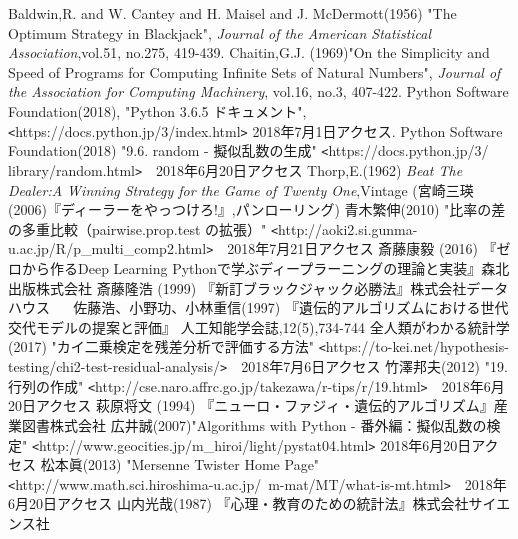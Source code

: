 \begin{thebibliography}{9}
   Baldwin,R. and W. Cantey and H. Maisel and J. McDermott(1956) "The Optimum Strategy in Blackjack", {\it{Journal of the American Statistical Association}},vol.51, no.275, 419-439.
   Chaitin,G.J. (1969)"On the Simplicity and Speed of Programs for Computing Infinite Sets of Natural Numbers", {\it{Journal of the Association for Computing Machinery}}, vol.16, no.3, 407-422.
   Python Software Foundation(2018), "Python 3.6.5 ドキュメント", \verb|<|https://docs.python.jp/3/index.html\verb|>| 2018年7月1日アクセス.
   Python Software Foundation(2018) "9.6. random - 擬似乱数の生成" \verb|<|https://docs.python.jp/3/ library/random.html\verb|>|　2018年6月20日アクセス
   Thorp,E.(1962) {\it{Beat The Dealer:A Winning Strategy for the Game of Twenty One}},Vintage (宮崎三瑛(2006)『ディーラーをやっつけろ!』,パンローリング)
   青木繁伸(2010) "比率の差の多重比較（pairwise.prop.test の拡張）" \verb|<|http://aoki2.si.gunma-u.ac.jp/R/p\_multi\_comp2.html\verb|>|　2018年7月21日アクセス
   斎藤康毅 (2016) 『ゼロから作るDeep Learning Pythonで学ぶディープラーニングの理論と実装』森北出版株式会社
   斎藤隆浩 (1999) 『新訂ブラックジャック必勝法』株式会社データハウス
　 佐藤浩、小野功、小林重信(1997) 『遺伝的アルゴリズムにおける世代交代モデルの提案と評価』 人工知能学会誌,12(5),734-744
   全人類がわかる統計学(2017) "カイ二乗検定を残差分析で評価する方法" \verb|<|https://to-kei.net/hypothesis-testing/chi2-test-residual-analysis/\verb|>|　2018年7月6日アクセス
   竹澤邦夫(2012) "19. 行列の作成" \verb|<|http://cse.naro.affrc.go.jp/takezawa/r-tips/r/19.html\verb|>|　2018年6月20日アクセス
   萩原将文 (1994) 『ニューロ・ファジィ・遺伝的アルゴリズム』産業図書株式会社
  広井誠(2007)"Algorithms with Python - 番外編：擬似乱数の検定" \verb|<|http://www.geocities.jp/m\_hiroi/light/pystat04.html\verb|>| 2018年6月20日アクセス
   松本眞(2013) "Mersenne Twister Home Page" \verb|<|http://www.math.sci.hiroshima-u.ac.jp/~m-mat/MT/what-is-mt.html\verb|>|　2018年6月20日アクセス
   山内光哉(1987) 『心理・教育のための統計法』株式会社サイエンス社
\end{thebibliography}
